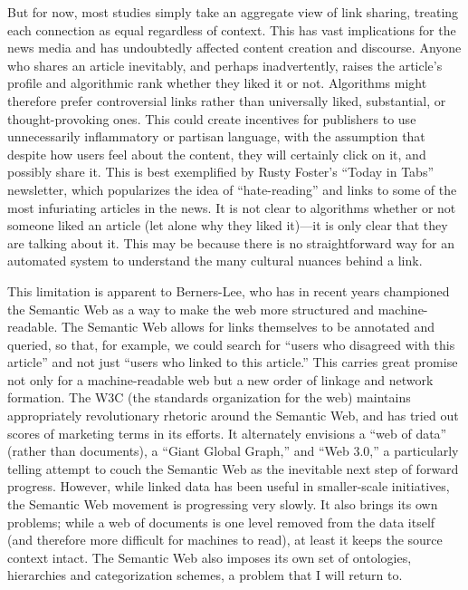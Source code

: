 But for now, most studies simply take an aggregate view of link sharing, treating each connection as equal regardless of context. This has vast implications for the news media and has undoubtedly affected content creation and discourse. Anyone who shares an article inevitably, and perhaps inadvertently, raises the article’s profile and algorithmic rank whether they liked it or not. Algorithms might therefore prefer controversial links rather than universally liked, substantial, or thought-provoking ones. This could create incentives for publishers to use unnecessarily inflammatory or partisan language, with the assumption that despite how users feel about the content, they will certainly click on it, and possibly share it. This is best exemplified by Rusty Foster’s “Today in Tabs” newsletter, which popularizes the idea of “hate-reading” and links to some of the most infuriating articles in the news. It is not clear to algorithms whether or not someone liked an article (let alone why they liked it)—it is only clear that they are talking about it. This may be because there is no straightforward way for an automated system to understand the many cultural nuances behind a link.

This limitation is apparent to Berners-Lee, who has in recent years championed the Semantic Web as a way to make the web more structured and machine-readable. The Semantic Web allows for links themselves to be annotated and queried, so that, for example, we could search for “users who disagreed with this article” and not just “users who linked to this article.” This carries great promise not only for a machine-readable web but a new order of linkage and network formation. The W3C (the standards organization for the web) maintains appropriately revolutionary rhetoric around the Semantic Web, and has tried out scores of marketing terms in its efforts. It alternately envisions a “web of data” (rather than documents), a “Giant Global Graph,” and “Web 3.0,” a particularly telling attempt to couch the Semantic Web as the inevitable next step of forward progress. However, while linked data has been useful in smaller-scale initiatives, the Semantic Web movement is progressing very slowly. It also brings its own problems; while a web of documents is one level removed from the data itself (and therefore more difficult for machines to read), at least it keeps the source context intact. The Semantic Web also imposes its own set of ontologies, hierarchies and categorization schemes, a problem that I will return to.

